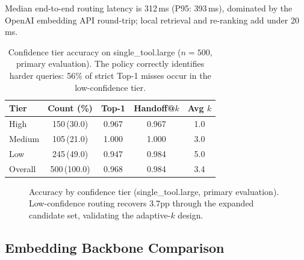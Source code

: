 \documentclass[sigconf,anonymous,review]{acmart}
\begin{document}
Median end-to-end routing latency is 312\,ms (P95: 393\,ms), dominated by the
OpenAI embedding API round-trip; local retrieval and re-ranking add under 20\,ms.

\begin{table}[t]
\centering
\caption{Confidence tier accuracy on single\_tool.large ($n=500$, primary
evaluation). The policy correctly identifies harder queries: 56\% of strict Top-1
misses occur in the low-confidence tier.}
\label{tab:confidence}
\begin{tabular}{@{}lcccc@{}}
\toprule
Tier    & Count (\%)    & Top-1 & Handoff@$k$ & Avg $k$ \\
\midrule
High    & 150\,(30.0)   & 0.967 & 0.967       & 1.0 \\
Medium  & 105\,(21.0)   & 1.000 & 1.000       & 3.0 \\
Low     & 245\,(49.0)   & 0.947 & 0.984       & 5.0 \\
Overall & 500\,(100.0)  & 0.968 & 0.984       & 3.4 \\
\bottomrule
\end{tabular}
\end{table}

\begin{figure}[t]
\centering
{}
\caption{Accuracy by confidence tier (single\_tool.large, primary evaluation).
Low-confidence routing recovers 3.7pp through the expanded candidate set,
validating the adaptive-$k$ design.}
\label{fig:confidence}
\end{figure}

\subsection{Embedding Backbone Comparison}
\label{sec:backbone}
\end{document}
